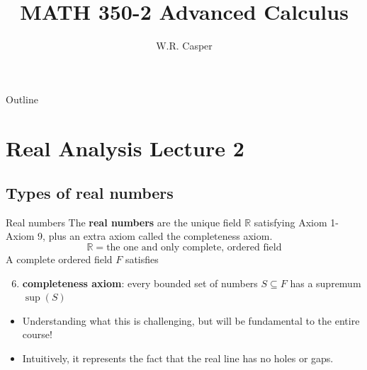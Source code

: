 \documentclass{beamer}
\title{MATH 350-2 Advanced Calculus}
\subtitle
{} %
\author[W.R. Casper] %
{W.R. Casper}
\institute[California State University Fullerton] %
{
  Department of Mathematics\\
  California State University Fullerton}
\begin{document}
\begin{frame}
  \titlepage
\end{frame}

\begin{frame}{Outline}
  \tableofcontents
\end{frame}



\section{Real Analysis Lecture 2}

\subsection{Types of real numbers}
\begin{frame}{Real numbers}
The \textbf{real numbers} are the unique field $\mathbb{R}$ satisfying Axiom 1-Axiom 9, plus an extra axiom called the completeness axiom.
$$\mathbb{R} = \text{the one and only complete, ordered field}$$
A complete ordered field $F$ satisfies
\begin{enumerate}[\text{A}1]
\setcounter{enumi}{5}
\pause
\item \textbf{completeness axiom}: every bounded set of numbers $S\subseteq F$ has a supremum $\sup(S)$
\end{enumerate}
\begin{itemize}
\pause
\item Understanding what this is challenging, but will be fundamental to the entire course!
\pause
\item Intuitively, it represents the fact that the real line has no holes or gaps.
\end{itemize}
\end{frame}
\end{document}
